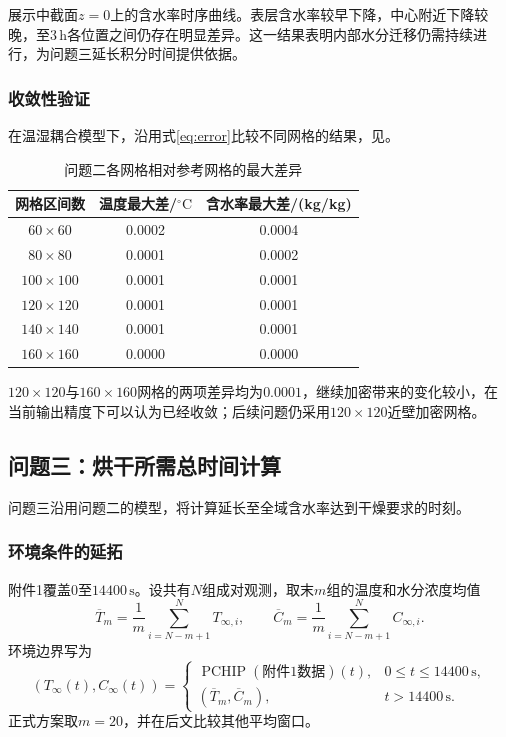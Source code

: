 展示中截面$z=0$上的含水率时序曲线。表层含水率较早下降，中心附近下降较晚，至$3\,\mathrm{h}$各位置之间仍存在明显差异。这一结果表明内部水分迁移仍需持续进行，为问题三延长积分时间提供依据。

\subsubsection{收敛性验证}
在温湿耦合模型下，沿用式\eqref{eq:error}比较不同网格的结果，见。
\begin{table}[!htbp]\centering\small
\caption{问题二各网格相对参考网格的最大差异}\label{tab:q2-grid}
\begin{tabular*}{0.96\textwidth}{@{\extracolsep{\fill}}ccc}
\toprule
网格区间数 & 温度最大差/$ {}^\circ\mathrm{C}$ & 含水率最大差/(kg/kg)\\\midrule
$60\times60$ & 0.0002 & 0.0004\\
$80\times80$ & 0.0001 & 0.0002\\
$100\times100$ & 0.0001 & 0.0001\\
$120\times120$ & 0.0001 & 0.0001\\
$140\times140$ & 0.0001 & 0.0001\\
$160\times160$ & 0.0000 & 0.0000\\
\bottomrule
\end{tabular*}
\par{}
\end{table}
$120\times120$与$160\times160$网格的两项差异均为$0.0001$，继续加密带来的变化较小，在当前输出精度下可以认为已经收敛；后续问题仍采用$120\times120$近壁加密网格。

\FloatBarrier
\subsection{问题三：烘干所需总时间计算}
问题三沿用问题二的模型，将计算延长至全域含水率达到干燥要求的时刻。
\subsubsection{环境条件的延拓}
附件1覆盖$0$至$14400\,\mathrm{s}$。设共有$N$组成对观测，取末$m$组的温度和水分浓度均值
\begin{equation}
\overline T_m=\frac1m\sum_{i=N-m+1}^{N}T_{\infty,i},\qquad
\overline C_m=\frac1m\sum_{i=N-m+1}^{N}C_{\infty,i}.
\end{equation}
环境边界写为
\begin{equation}\label{eq:tail}
(T_\infty(t),C_\infty(t))=
\begin{cases}
\operatorname{PCHIP}(\text{附件1数据})(t),&0\le t\le14400\,\mathrm{s},\\
(\overline T_m,\overline C_m),&t>14400\,\mathrm{s}.
\end{cases}
\end{equation}
正式方案取$m=20$，并在后文比较其他平均窗口。

